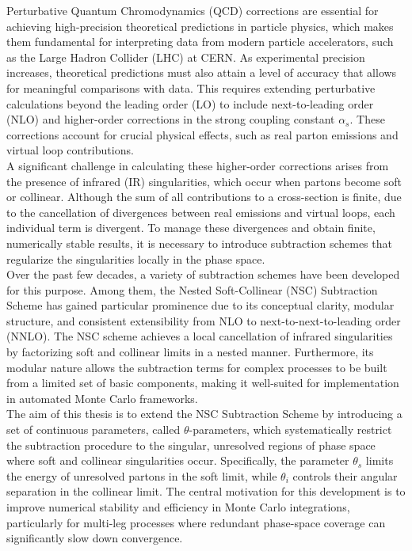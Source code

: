 Perturbative Quantum Chromodynamics (QCD) corrections are essential for achieving high-precision theoretical predictions in particle physics, which makes them fundamental for interpreting data from modern particle accelerators, such as the Large Hadron Collider (LHC) at CERN. As experimental precision increases, theoretical predictions must also attain a level of accuracy that allows for meaningful comparisons with data. This requires extending perturbative calculations beyond the leading order (LO) to include next-to-leading order (NLO) and higher-order corrections in the strong coupling constant $\alpha_s$. These corrections account for crucial physical effects, such as real parton emissions and virtual loop contributions. \\
A significant challenge in calculating these higher-order corrections arises from the presence of infrared (IR) singularities, which occur when partons become soft or collinear. Although the sum of all contributions to a cross-section is finite, due to the cancellation of divergences between real emissions and virtual loops, each individual term is divergent. To manage these divergences and obtain finite, numerically stable results, it is necessary to introduce subtraction schemes that regularize the singularities locally in the phase space. \\
Over the past few decades, a variety of subtraction schemes have been developed for this purpose. Among them, the Nested Soft-Collinear (NSC) Subtraction Scheme has gained particular prominence due to its conceptual clarity, modular structure, and consistent extensibility from NLO to next-to-next-to-leading order (NNLO). The NSC scheme achieves a local cancellation of infrared singularities by factorizing soft and collinear limits in a nested manner. Furthermore, its modular nature allows the subtraction terms for complex processes to be built from a limited set of basic components, making it well-suited for implementation in automated Monte Carlo frameworks. \\
The aim of this thesis is to extend the NSC Subtraction Scheme by introducing a set of continuous parameters, called $\theta$-parameters, which systematically restrict the subtraction procedure to the singular, unresolved regions of phase space where soft and collinear singularities occur. Specifically, the parameter $\theta_s$ limits the energy of unresolved partons in the soft limit, while $\theta_i$ controls their angular separation in the collinear limit. The central motivation for this development is to improve numerical stability and efficiency in Monte Carlo integrations, particularly for multi-leg processes where redundant phase-space coverage can significantly slow down convergence. \\
